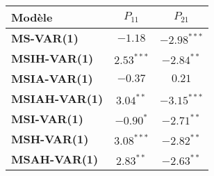 \begin{tabular}{lcc}
\toprule
\textbf{Modèle} & \textbf{$P_{11}$} & \textbf{$P_{21}$} \\
\midrule
\textbf{MS-VAR(1)} & $-1.18$ & $-2.98^{***}$ \\
\textbf{MSIH-VAR(1)} & $2.53^{***}$ & $-2.84^{**}$ \\
\textbf{MSIA-VAR(1)} & $-0.37$ & $0.21$ \\
\textbf{MSIAH-VAR(1)} & $3.04^{**}$ & $-3.15^{***}$ \\
\textbf{MSI-VAR(1)} & $-0.90^{*}$ & $-2.71^{**}$ \\
\textbf{MSH-VAR(1)} & $3.08^{***}$ & $-2.82^{**}$ \\
\textbf{MSAH-VAR(1)} & $2.83^{**}$ & $-2.63^{**}$ \\
\bottomrule
\end{tabular}